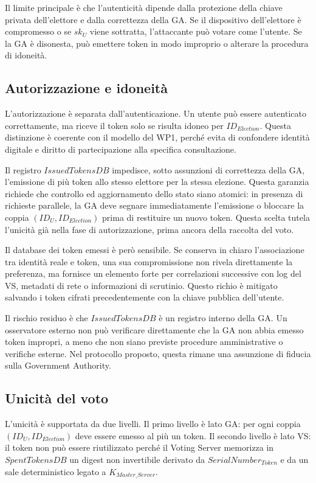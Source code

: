 \documentclass[a4paper,12pt]{article}
\begin{document}
Il limite principale è che l'autenticità dipende dalla protezione della chiave privata dell'elettore e dalla correttezza della GA.
Se il dispositivo dell'elettore è compromesso o se \(sk_U\) viene sottratta, l'attaccante può votare come l'utente.
Se la GA è disonesta, può emettere token in modo improprio o alterare la procedura di idoneità.

\subsection{Autorizzazione e idoneità}

L'autorizzazione è separata dall'autenticazione.
Un utente può essere autenticato correttamente, ma riceve il token solo se risulta idoneo per \(ID_{Election}\).
Questa distinzione è coerente con il modello del WP1, perché evita di confondere identità digitale e diritto di partecipazione alla specifica consultazione.

Il registro \(IssuedTokensDB\) impedisce, sotto assunzioni di correttezza della GA, l'emissione di più token allo stesso elettore per la stessa elezione. Questa garanzia richiede che controllo ed aggiornamento dello stato siano atomici: in presenza di richieste parallele, la GA deve segnare immediatamente l'emissione o bloccare la coppia \((ID_U, ID_{Election})\) prima di restituire un nuovo token.
Questa scelta tutela l'unicità già nella fase di autorizzazione, prima ancora della raccolta del voto.

Il database dei token emessi è però sensibile. Se conserva in chiaro l'associazione tra identità reale e token, una sua compromissione non rivela direttamente la preferenza, ma fornisce un elemento forte per correlazioni successive con log del VS, metadati di rete o informazioni di scrutinio. Questo richio è mitigato salvando i token cifrati precedentemente con la chiave pubblica dell'utente.

Il rischio residuo è che \(IssuedTokensDB\) è un registro interno della GA.
Un osservatore esterno non può verificare direttamente che la GA non abbia emesso token impropri, a meno che non siano previste procedure amministrative o verifiche esterne.
Nel protocollo proposto, questa rimane una assunzione di fiducia sulla Government Authority.

\subsection{Unicità del voto}

L'unicità è supportata da due livelli.
Il primo livello è lato GA: per ogni coppia \((ID_U, ID_{Election})\) deve essere emesso al più un token.
Il secondo livello è lato VS: il token non può essere riutilizzato perché il Voting Server memorizza in \(SpentTokensDB\) un digest non invertibile derivato da \(SerialNumber_{Token}\) e da un sale deterministico legato a \(K_{Master\_Server}\).
\end{document}
